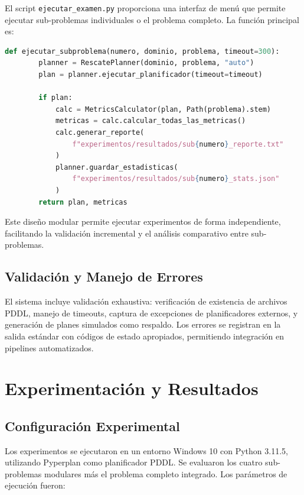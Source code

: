 \documentclass[conference]{IEEEtran}
\begin{document}
    El script \texttt{ejecutar\_examen.py} proporciona una interfaz de menú que permite ejecutar sub-problemas individuales o el problema completo. La función principal es:

    \begin{lstlisting}[language=Python]
    def ejecutar_subproblema(numero, dominio, problema, timeout=300):
        planner = RescatePlanner(dominio, problema, "auto")
        plan = planner.ejecutar_planificador(timeout=timeout)
        
        if plan:
            calc = MetricsCalculator(plan, Path(problema).stem)
            metricas = calc.calcular_todas_las_metricas()
            calc.generar_reporte(
                f"experimentos/resultados/sub{numero}_reporte.txt"
            )
            planner.guardar_estadisticas(
                f"experimentos/resultados/sub{numero}_stats.json"
            )
        return plan, metricas
    \end{lstlisting}

    Este diseño modular permite ejecutar experimentos de forma independiente, facilitando la validación incremental y el análisis comparativo entre sub-problemas.

    \subsection{Validación y Manejo de Errores}

    El sistema incluye validación exhaustiva: verificación de existencia de archivos PDDL, manejo de timeouts, captura de excepciones de planificadores externos, y generación de planes simulados como respaldo. Los errores se registran en la salida estándar con códigos de estado apropiados, permitiendo integración en pipelines automatizados.

    \section{Experimentación y Resultados}

    \subsection{Configuración Experimental}

    Los experimentos se ejecutaron en un entorno Windows 10 con Python 3.11.5, utilizando Pyperplan como planificador PDDL. Se evaluaron los cuatro sub-problemas modulares más el problema completo integrado. Los parámetros de ejecución fueron:
\end{document}
